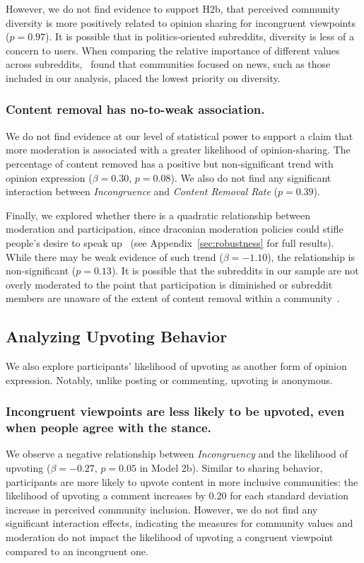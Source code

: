 However, we do not find evidence to support H2b, that perceived community diversity is more positively related to opinion sharing for incongruent viewpoints ($p=0.97$). It is possible that in politics-oriented subreddits, diversity is less of a concern to users. When comparing the relative importance of different values across subreddits,~\citet{weld2021making} found that communities focused on news, such as those included in our analysis, placed the lowest priority on diversity. 




\subsubsection{Content removal has no-to-weak association.}
We do not find evidence at our level of statistical power to support a claim that more moderation is associated with a greater likelihood of opinion-sharing. The percentage of content removed has a positive but non-significant trend with opinion expression ($\beta=0.30$, $p=0.08$). We also do not find any significant interaction between \emph{Incongruence} and \emph{Content Removal Rate} ($p=0.39$).

Finally, we explored whether there is a quadratic relationship between moderation and participation, since draconian moderation policies could stifle people's desire to speak up~\cite{kraut2012building} (see Appendix~\ref{sec:robustness} for full results). While there may be weak evidence of such trend ($\beta= -1.10$), the relationship is non-significant ($p=0.13$). It is possible that the subreddits in our sample are not overly moderated to the point that participation is diminished or subreddit members are unaware of the extent of content removal within a community~\cite{jhaver2019did}. 



\subsection{Analyzing Upvoting Behavior}
We also explore participants' likelihood of upvoting as another form of opinion expression. Notably, unlike posting or commenting, upvoting is anonymous. 

\subsubsection{Incongruent viewpoints are less likely to be upvoted, even when people agree with the stance.} We observe a negative relationship between \textit{Incongruency} and the likelihood of upvoting ($\beta = -0.27$, $p=0.05$ in Model 2b). Similar to sharing behavior, participants are more likely to upvote content in more inclusive communities: the likelihood of upvoting a comment increases by $0.20$ for each standard deviation increase in perceived community inclusion. However, we do not find any significant interaction effects, indicating the measures for community values and moderation do not impact the likelihood of upvoting a congruent viewpoint compared to an incongruent one. 



